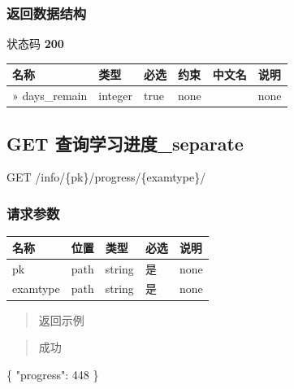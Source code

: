 \documentclass[
]{article}
\newenvironment{Shaded}{}{}
\newcommand{\DataTypeTok}[1]{\textcolor[rgb]{0.56,0.13,0.00}{#1}}
\newcommand{\DecValTok}[1]{\textcolor[rgb]{0.25,0.63,0.44}{#1}}
\newcommand{\FunctionTok}[1]{\textcolor[rgb]{0.02,0.16,0.49}{#1}}
\begin{document}
\hypertarget{ux8fd4ux56deux6570ux636eux7ed3ux6784-34}{%
\subsubsection{返回数据结构}\label{ux8fd4ux56deux6570ux636eux7ed3ux6784-34}}

状态码 \textbf{200}

\begin{longtable}[]{@{}llllll@{}}
\toprule
名称 & 类型 & 必选 & 约束 & 中文名 & 说明 \\
\midrule
\endhead
» days\_remain & integer & true & none & & none \\
\bottomrule
\end{longtable}

\hypertarget{get-ux67e5ux8be2ux5b66ux4e60ux8fdbux5ea6separate}{%
\subsection{GET
查询学习进度\_separate}\label{get-ux67e5ux8be2ux5b66ux4e60ux8fdbux5ea6separate}}

GET /info/\{pk\}/progress/\{examtype\}/

\hypertarget{ux8bf7ux6c42ux53c2ux6570-40}{%
\subsubsection{请求参数}\label{ux8bf7ux6c42ux53c2ux6570-40}}

\begin{longtable}[]{@{}lllll@{}}
\toprule
名称 & 位置 & 类型 & 必选 & 说明 \\
\midrule
\endhead
pk & path & string & 是 & none \\
examtype & path & string & 是 & none \\
\bottomrule
\end{longtable}

\begin{quote}
返回示例
\end{quote}

\begin{quote}
成功
\end{quote}

\begin{Shaded}
\begin{Highlighting}[]
\FunctionTok{\{}
  \DataTypeTok{"progress"}\FunctionTok{:} \DecValTok{448}
\FunctionTok{\}}
\end{Highlighting}
\end{Shaded}
\end{document}
